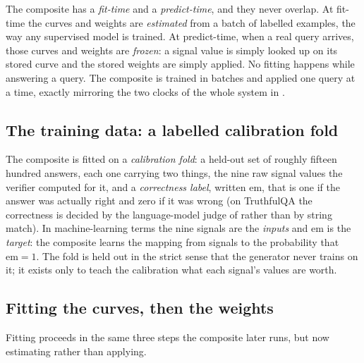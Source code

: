 \begin{intuition}
The composite has a \emph{fit-time} and a \emph{predict-time}, and they never
overlap. At fit-time the curves and weights are \emph{estimated} from a batch of
labelled examples, the way any supervised model is trained. At predict-time, when a
real query arrives, those curves and weights are \emph{frozen}: a signal value is
simply looked up on its stored curve and the stored weights are simply applied. No
fitting happens while answering a query. The composite is trained in batches and
applied one query at a time, exactly mirroring the two clocks of the whole system in
.
\end{intuition}

\subsection*{The training data: a labelled calibration fold}

The composite is fitted on a \emph{calibration fold}: a held-out set of roughly
fifteen hundred answers, each one carrying two things, the nine raw signal values the
verifier computed for it, and a \emph{correctness label}, written $\mathrm{em}$, that
is one if the answer was actually right and zero if it was wrong (on TruthfulQA the
correctness is decided by the language-model judge of  rather than
by string match). In machine-learning terms the nine signals are the \emph{inputs} and
$\mathrm{em}$ is the \emph{target}: the composite learns the mapping from signals to
the probability that $\mathrm{em} = 1$. The fold is held out in the strict sense that
the generator never trains on it; it exists only to teach the calibration what each
signal's values are worth.

\subsection*{Fitting the curves, then the weights}

Fitting proceeds in the same three steps the composite later runs, but now estimating
rather than applying.

